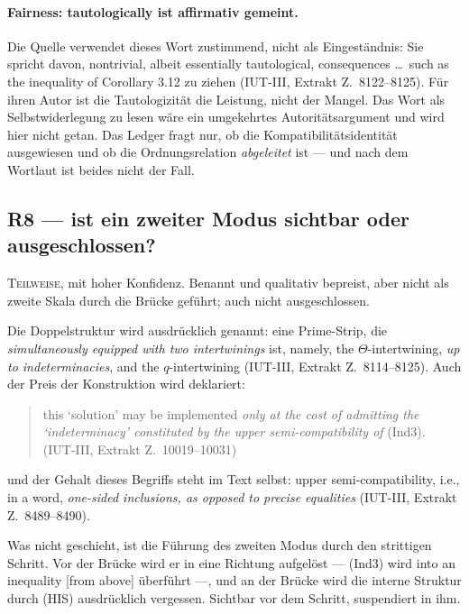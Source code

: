 \documentclass[11pt,a4paper]{article}
\theoremstyle{definition}
\newcommand{\anchor}[2]{(#1, Extrakt Z.~#2)}
\begin{document}
\paragraph{Fairness: \glqq tautologically\grqq{} ist affirmativ gemeint.} Die Quelle
verwendet dieses Wort zustimmend, nicht als Eingeständnis: Sie spricht davon,
\glqq nontrivial, albeit essentially tautological, consequences \dots\ such as the
inequality of Corollary 3.12\grqq{} zu ziehen \anchor{IUT-III}{8122--8125}. Für ihren
Autor ist die Tautologizität die Leistung, nicht der Mangel. Das Wort als
Selbstwiderlegung zu lesen wäre ein umgekehrtes Autoritätsargument und wird hier
nicht getan. Das Ledger fragt nur, ob die Kompatibilitätsidentität ausgewiesen und
ob die Ordnungsrelation \emph{abgeleitet} ist --- und nach dem Wortlaut ist
beides nicht der Fall.

\subsection{R8 --- ist ein zweiter Modus sichtbar oder ausgeschlossen?}

\textsc{Teilweise}, mit hoher Konfidenz. Benannt und qualitativ bepreist, aber
nicht als zweite Skala durch die Brücke geführt; auch nicht ausgeschlossen.

Die Doppelstruktur wird ausdrücklich genannt: eine Prime-Strip, die
\glqq \emph{simultaneously equipped with two intertwinings}\grqq{} ist, \glqq namely, the
$\Theta$-intertwining, \emph{up to indeterminacies}, and the $q$-intertwining\grqq
\anchor{IUT-III}{8114--8125}. Auch der Preis der Konstruktion wird deklariert:

\begin{quote}\small
\glqq this `solution' may be implemented \emph{only at the cost of admitting the
`indeterminacy' constituted by the upper semi-compatibility of} (Ind3).\grqq
\hfill\anchor{IUT-III}{10019--10031}
\end{quote}

und der Gehalt dieses Begriffs steht im Text selbst: \glqq upper semi-compatibility,
i.e., in a word, \emph{one-sided inclusions, as opposed to precise equalities}\grqq
\anchor{IUT-III}{8489--8490}.

Was nicht geschieht, ist die Führung des zweiten Modus durch den strittigen
Schritt. Vor der Brücke wird er in eine Richtung aufgelöst --- (Ind3) wird \glqq into
an inequality [from above]\grqq{} überführt ---, und an der Brücke wird die interne
Struktur durch (HIS) ausdrücklich vergessen. Sichtbar vor dem Schritt, suspendiert
in ihm.
\end{document}
